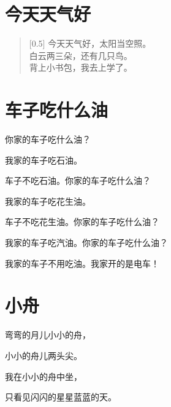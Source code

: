 \documentclass[12pt,UTF-8,openany]{ctexbook}
\begin{document}
\chapter{今天天气好}

\begin{large}
    
    \begin{verse}[0.5\linewidth]
        今天天气好，太阳当空照。 \\
        白云两三朵，还有几只鸟。 \\
        背上小书包，我去上学了。
    \end{verse}
    
\end{large}





\chapter{车子吃什么油}

\begin{large}
    
    你家的车子吃什么油？
    
    我家的车子吃石油。
    
    车子不吃石油。你家的车子吃什么油？
    
    我家的车子吃花生油。
    
    车子不吃花生油。你家的车子吃什么油？
    
    我家的车子吃汽油。你家的车子吃什么油？
    
    我家的车子不用吃油。我家开的是电车！
    
\end{large}





\chapter{小舟}

\begin{large}
    
    弯弯的月儿小小的舟，
    
    小小的舟儿两头尖。
    
    我在小小的舟中坐，
    
    只看见闪闪的星星蓝蓝的天。
    
\end{large}
\end{document}
